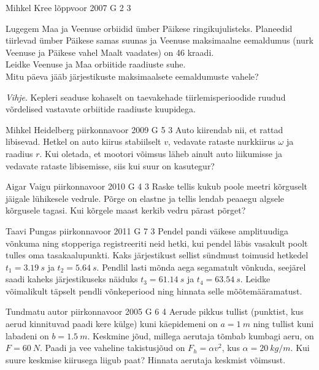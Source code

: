 \documentclass[11pt, twoside]{article}
\begin{document}
{%
{Mihkel Kree} %
{lõppvoor} %
{2007} %
{G 2} %
{3} %
{
\ifStatement
Lugegem Maa ja Veenuse orbiidid ümber Päikese ringikujulisteks. Planeedid tiirlevad ümber Päikese samas suunas ja Veenuse maksimaalne eemaldumus (nurk Veenuse ja Päikese vahel Maalt vaadates) on 46 kraadi.\\
\osa Leidke Veenuse ja Maa orbiitide raadiuste suhe.\\
\osa Mitu päeva jääb järjestikuste maksimaalsete eemaldumuste vahele?

\emph{Vihje}. Kepleri seaduse kohaselt on taevakehade tiirlemisperioodide ruudud võrdelised vastavate orbiitide raadiuste kuupidega.
\fi
}

{Mihkel Heidelberg} %
{piirkonnavoor} %
{2009} %
{G 5} %
{3} %
{
\ifStatement
Auto kiirendab nii, et rattad libisevad. Hetkel on auto kiirus stabiilselt $v$, vedavate rataste nurkkiirus $\omega$ ja raadius $r$. Kui oletada, et mootori võimsus läheb ainult auto liikumisse ja vedavate rataste libisemisse, siis kui suur on kasutegur?
\fi
}

{Aigar Vaigu} %
{piirkonnavoor} %
{2010} %
{G 4} %
{3} %
{
\ifStatement
Raske tellis kukub poole meetri kõrguselt jäigale lühikesele vedrule. Põrge
on elastne ja tellis lendab peaaegu algsele kõrgusele tagasi. Kui
kõrgele maast kerkib vedru pärast põrget?
\fi
}

{Taavi Pungas} %
{piirkonnavoor} %
{2011} %
{G 7} %
{3} %
{
\ifStatement
Pendel pandi väikese amplituudiga võnkuma ning stopperiga registreeriti neid hetki, kui pendel läbis vasakult poolt tulles oma tasakaalupunkti. Kaks järjestikust sellist sündmust toimusid hetkedel $t_1=\SI{3,19}{s}$ ja $t_2=\SI{5,64}{s}$. Pendlil lasti mõnda aega segamatult võnkuda, seejärel saadi kaheks järjestikuseks näiduks $t_3=\SI{61,14}{s}$ ja $t_4=\SI{63,54}{s}$. Leidke võimalikult täpselt pendli võnkeperiood ning hinnata selle mõõtemääramatust.
\fi
}

{Tundmatu autor} %
{piirkonnavoor} %
{2005} %
{G 6} %
{4} %
{
\ifStatement
Aerude pikkus tullist (punktist, kus aerud kinnituvad paadi kere külge) kuni käepidemeni on $a = \SI{1}{m}$ ning tullist kuni labadeni on $b = \SI{1,5}{m}$. Keskmine jõud, millega aerutaja tõmbab kumbagi aeru, on $F = \SI{60}{N}$. Paadi ja vee vaheline takistusjõud on $F_h = \alpha v^2$, kus $\alpha = \SI{20}{kg/m}$. Kui suure keskmise kiirusega liigub paat? Hinnata aerutaja keskmist võimsust.
\fi
}

}
\end{document}
